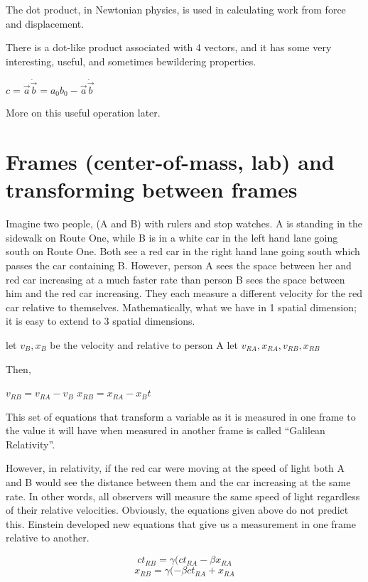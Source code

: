 The dot product, in Newtonian physics, is used in calculating work from force and displacement.

There is a dot-like product associated with 4 vectors, and it has some very interesting, useful, and sometimes bewildering properties.

	    { $c = \vec a \dot \vec b = a_0b_0 - \vec a \dot \vec b$}

More on this useful operation later.

\section{Frames (center-of-mass, lab) and transforming between frames}

Imagine two people, (A and B) with rulers and stop watches.  A is standing in the sidewalk on Route One, while B is in a white car in the left hand lane going south on Route One.  Both see a red car in the right hand lane going south which passes the car containing B.  However, person A sees the space between her and red car increasing at a much faster rate than person B sees the space between him and the red car increasing.  They each measure a different velocity for the red car relative to themselves.  Mathematically, what we have in 1 spatial dimension; it is easy to extend to 3 spatial dimensions.

	 let $v_B, x_B$ be the velocity and relative to person A 
       let $v_{RA}, x_{RA},v_{RB}, x_{RB}$
	  

Then,
	  
	  $v_{RB} = v_{RA} - v_B$
        $x_{RB} = x_{RA} - x_B t$

This set of equations that transform a variable as it is measured in one frame to the value it will have when measured in another frame is called “Galilean Relativity”.

However, in relativity, if the red car were moving at the speed of light both A and B would see the distance between them and the car increasing at the same rate.  In other words, all observers will measure the same speed of light regardless of their relative velocities.  Obviously, the equations given above do not predict this.  Einstein developed new equations that give us a measurement in one frame relative to another.  


	\begin{equation} ct_{RB} = \gamma(ct_{RA} - \beta x_{RA} \end{equation} 
	\begin{equation}  x_{RB} = \gamma(- \beta ct_{RA} + x_{RA} 	 \end{equation} 

